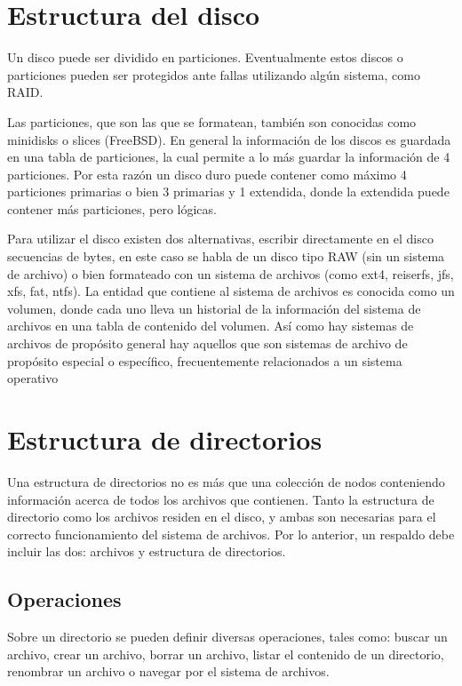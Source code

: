 \section{Estructura del disco}
Un disco puede ser dividido en particiones. Eventualmente estos discos o
particiones pueden ser protegidos ante fallas utilizando algún sistema, como
RAID.

Las particiones, que son las que se formatean, también son conocidas como
minidisks o slices (FreeBSD). En general la información de los discos es
guardada en una tabla de particiones, la cual permite a lo más guardar la
información de 4 particiones. Por esta razón un disco duro puede contener como
máximo 4 particiones primarias o bien 3 primarias y 1 extendida, donde la
extendida puede contener más particiones, pero lógicas.

Para utilizar el disco existen dos alternativas, escribir directamente en el
disco secuencias de bytes, en este caso se habla de un disco tipo RAW (sin un
sistema de archivo) o bien formateado con un sistema de archivos (como ext4,
reiserfs, jfs, xfs, fat, ntfs). La entidad que contiene al sistema de archivos
es conocida como un volumen, donde cada uno lleva un historial de la información
del sistema de archivos en una tabla de contenido del volumen. Así como hay
sistemas de archivos de propósito general hay aquellos que son sistemas de
archivo de propósito especial o específico, frecuentemente relacionados a un
sistema operativo

\section{Estructura de directorios}
Una estructura de directorios no es más que una colección de nodos conteniendo
información acerca de todos los archivos que contienen. Tanto la estructura de
directorio como los archivos residen en el disco, y ambas son necesarias para el
correcto funcionamiento del sistema de archivos. Por lo anterior, un respaldo
debe incluir las dos: archivos y estructura de directorios.

\subsection{Operaciones}
Sobre un directorio se pueden definir diversas operaciones, tales como: buscar
un archivo, crear un archivo, borrar un archivo, listar el contenido de un
directorio, renombrar un archivo o navegar por el sistema de archivos.

